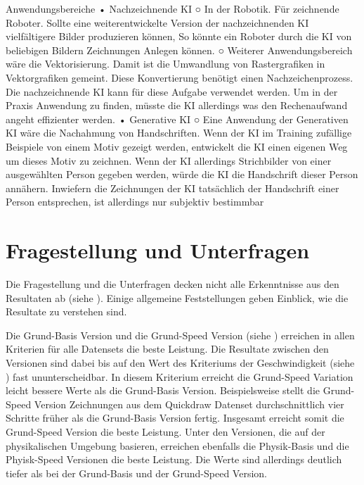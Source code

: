 Anwendungsbereiche
	• Nachzeichnende KI
		○ In der Robotik. Für zeichnende Roboter. Sollte eine weiterentwickelte Version der nachzeichnenden KI vielfältigere Bilder produzieren können, So könnte ein Roboter durch die KI von beliebigen Bildern Zeichnungen Anlegen können.
		○ Weiterer Anwendungsbereich wäre die Vektorisierung. Damit ist die Umwandlung von Rastergrafiken in Vektorgrafiken gemeint. Diese Konvertierung benötigt einen Nachzeichenprozess. Die nachzeichnende KI kann für diese Aufgabe verwendet werden. Um in der Praxis Anwendung zu finden, müsste die KI allerdings was den Rechenaufwand angeht effizienter werden.
	• Generative KI
		○ Eine Anwendung der Generativen KI wäre die Nachahmung von Handschriften. Wenn der KI im Training zufällige Beispiele von einem Motiv gezeigt werden, entwickelt die KI einen eigenen Weg um dieses Motiv zu zeichnen. Wenn der KI allerdings Strichbilder von einer ausgewählten Person gegeben werden, würde die KI die Handschrift dieser Person annähern. Inwiefern die Zeichnungen der KI tatsächlich der Handschrift einer Person entsprechen, ist allerdings nur subjektiv bestimmbar 

		
	







 
 
\section{Fragestellung und Unterfragen}\label{chap:d_frage}
Die Fragestellung und die Unterfragen decken nicht alle Erkenntnisse aus den
Resultaten ab (siehe ). Einige allgemeine Feststellungen geben
Einblick, wie die Resultate zu verstehen sind.
 
Die Grund-Basis Version und die Grund-Speed Version (siehe
) erreichen in allen Kriterien für alle Datensets die
beste Leistung. Die Resultate zwischen den Versionen sind dabei bis auf den Wert
des Kriteriums der Geschwindigkeit (siehe ) fast
ununterscheidbar. In diesem Kriterium erreicht die Grund-Speed Variation leicht
bessere Werte als die Grund-Basis Version. Beispielsweise stellt die Grund-Speed
Version Zeichnungen aus dem Quickdraw Datenset durchschnittlich vier Schritte
früher als die Grund-Basis Version fertig. Insgesamt erreicht somit die
Grund-Speed Version die beste Leistung. Unter den Versionen, die auf der
physikalischen Umgebung basieren, erreichen ebenfalls die Physik-Basis und die
Phyisk-Speed Versionen die beste Leistung. Die Werte sind allerdings deutlich
tiefer als bei der Grund-Basis und der Grund-Speed Version.
 
